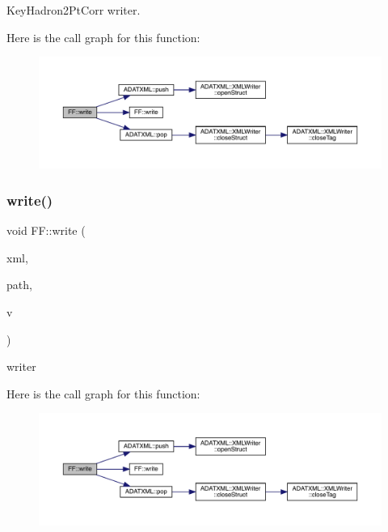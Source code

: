 Key\+Hadron2\+Pt\+Corr writer. 

Here is the call graph for this function\+:\nopagebreak
\begin{figure}[H]
\begin{center}
\leavevmode
\includegraphics[width=350pt]{d5/da6/namespaceFF_ae24f1269c1aa6329a00ea570a38546e6_cgraph}
\end{center}
\end{figure}
\mbox{\label{namespaceFF_a0c22ea2c009e3006aa0f745b9a3e2cc2}} 
\subsubsection{\texorpdfstring{write()}{write()}\hspace{0.1cm}{\footnotesize\ttfamily [7/13]}}
{\footnotesize\ttfamily void F\+F\+::write (\begin{DoxyParamCaption}\item[{X\+M\+L\+Writer \&}]{xml,  }\item[{const std\+::string \&}]{path,  }\item[{const \mbox{\hyperlink{classFF_1_1DiscoValOperator__t}{Disco\+Val\+Operator\+\_\+t}} \&}]{v }\end{DoxyParamCaption})}



writer 

Here is the call graph for this function\+:\nopagebreak
\begin{figure}[H]
\begin{center}
\leavevmode
\includegraphics[width=350pt]{d5/da6/namespaceFF_a0c22ea2c009e3006aa0f745b9a3e2cc2_cgraph}
\end{center}
\end{figure}
\mbox{\label{namespaceFF_a78fdf587c961ada1987ee8f443e3d961}} 
